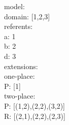 \documentclass[12pt,a4paper]{article}
\begin{document}
\noindent
model:\\
\hspace*{1em}  domain: [1,2,3]\\
\hspace*{1em}  referents: \\
\hspace*{3em} a: 1 \\
\hspace*{3em} b: 2 \\
\hspace*{3em} d: 3\\
\hspace*{1em}  extensions:\\
\hspace*{2em}    one-place: \\
\hspace*{4em} P: [1]\\
\hspace*{2em}    two-place: \\
\hspace*{4em} P: [(1,2),(2,2),(3,2)]\\
\hspace*{4em} R: [(2,1),(2,2),(2,3)]\\
\end{document}
